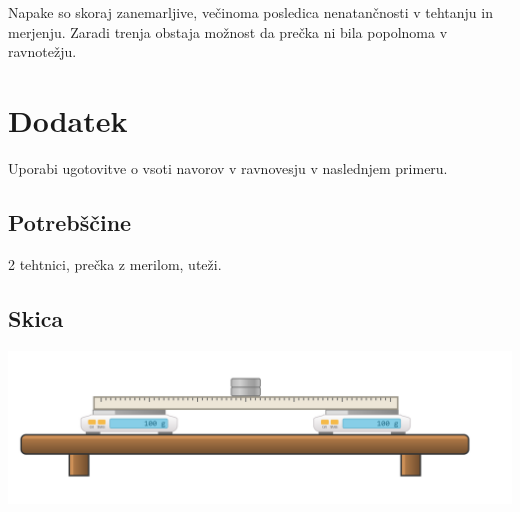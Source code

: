 \documentclass[a4paper]{article}
\begin{document}
Napake so skoraj zanemarljive, večinoma posledica nenatančnosti v tehtanju in merjenju. Zaradi trenja obstaja možnost da prečka ni bila popolnoma v ravnotežju. 

\section*{Dodatek}
Uporabi ugotovitve o vsoti navorov v ravnovesju v naslednjem primeru.
\subsection*{Potrebščine}
2 tehtnici, prečka z merilom, uteži.
\subsection*{Skica}
\includegraphics[scale=0.5]{dodatek_skica.png}
\end{document}
